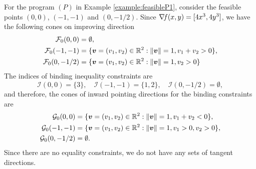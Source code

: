 \begin{example}
For the program $(P)$ in Example \ref{example:feasibleP1}, consider the feasible points $(0,0)$, $(-1,-1)$ and $(0,-1/2)$.  Since $\mathop{\nabla\! {f}}(x,y) = [ 4x^3, 4y^3 ]$, we have the following cones on improving direction 
\begin{align*}
\mathcal{F}_0(0,0) &= \emptyset, \\
\mathcal{F}_0(-1,-1) &= \{ \boldsymbol{v} = (v_1, v_2) \in \mathbb{R}^2 : \lVert \boldsymbol{v} \rVert=1, v_1+v_2 > 0 \}, \\
\mathcal{F}_0(0,-1/2) &= \{ \boldsymbol{v} = (v_1, v_2) \in \mathbb{R}^2 : \lVert \boldsymbol{v} \rVert = 1, v_2 > 0 \}
\end{align*}
The indices of binding inequality constraints are
\begin{equation*}
\mathcal{I}(0,0) = \{ 3 \}, \quad \mathcal{I}(-1,-1) = \{ 1,2 \}, \quad \mathcal{I}(0,-1/2)= \emptyset,
\end{equation*}
and therefore, the cones of inward pointing directions for the binding constraints are
\begin{align*}
\mathcal{G}_0(0,0) &= \{ \boldsymbol{v} = (v_1, v_2) \in \mathbb{R}^2 : \lVert \boldsymbol{v} \rVert=1, v_1+v_2 < 0 \}, \\
\mathcal{G}_0(-1,-1) &= \{ \boldsymbol{v} = (v_1, v_2) \in \mathbb{R}^2 : \lVert \boldsymbol{v} \rVert=1, v_1 > 0,  v_2 > 0 \},\\
\mathcal{G}_0(0,-1/2) &= \emptyset.
\end{align*}
Since there are no equality constraints, we do not have any sets of tangent directions.


\end{example}

